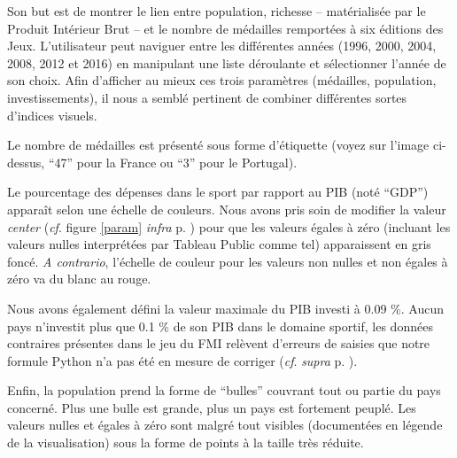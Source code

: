 \documentclass[hidelinks, 12pt]{report}
\begin{document}
Son but est de montrer le lien entre population, richesse -- matérialisée par le Produit Intérieur Brut -- et le nombre de médailles remportées à six éditions des Jeux. L'utilisateur peut naviguer entre les différentes années (1996, 2000, 2004, 2008, 2012 et 2016) en manipulant une liste déroulante et sélectionner l'année de son choix. Afin d'afficher au mieux ces trois paramètres (médailles, population, investissements), il nous a semblé pertinent de combiner différentes sortes d'indices visuels.

Le nombre de médailles est présenté sous forme d'étiquette (voyez sur l'image ci-dessus, \enquote{47} pour la France ou \enquote{3} pour le Portugal).

\label{color}Le pourcentage des dépenses dans le sport par rapport au PIB (noté \enquote{GDP}) apparaît selon une échelle de couleurs. Nous avons pris soin de modifier la valeur \textit{center} (\textit{cf}. figure \ref{param} \textit{infra} p. \pageref{param}) pour que les valeurs égales à zéro (incluant les valeurs nulles interprétées par Tableau Public comme tel) apparaissent en gris foncé. \textit{A contrario}, l'échelle de couleur pour les valeurs non nulles et non égales à zéro va du blanc au rouge. 

Nous avons également défini la valeur maximale du PIB investi à 0.09 \%. Aucun pays n'investit plus que 0.1 \% de son PIB dans le domaine sportif, les données contraires présentes dans le jeu du FMI relèvent d'erreurs de saisies que notre formule Python n'a pas été en mesure de corriger (\textit{cf}. \textit{supra} p. \pageref{python}). 

Enfin, la population prend la forme de \enquote{bulles} couvrant tout ou partie du pays concerné. Plus une bulle est grande, plus un pays est fortement peuplé. Les valeurs nulles et égales à zéro sont malgré tout visibles (documentées en légende de la visualisation) sous la forme de points à la taille très réduite.
\end{document}
